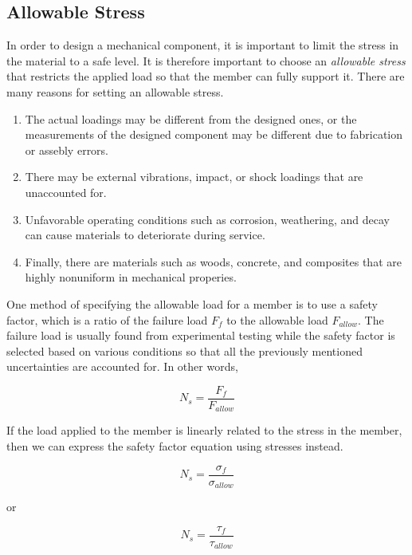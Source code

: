 \documentclass[
fontsize=10pt,
a4paper,
twosides=false,
open=any,
svgnames,
]{kaobook} %
\begin{document}
\subsection{Allowable Stress}

In order to design a mechanical component, it is important to limit the stress in the material to a safe level. It is therefore important to choose an \emph{allowable stress} that restricts the applied load so that the member can fully support it. There are many reasons for setting an allowable stress.

\begin{enumerate}
  \item The actual loadings may be different from the designed ones, or the measurements of the designed component may be different due to fabrication or assebly errors.
  \item There may be external vibrations, impact, or shock loadings that are unaccounted for.
  \item Unfavorable operating conditions such as corrosion, weathering, and decay can cause materials to deteriorate during service.
  \item Finally, there are materials such as woods, concrete, and composites that are highly nonuniform in mechanical properies.
\end{enumerate}

One method of specifying the allowable load for a member is to use a safety factor, which is a ratio of the failure load $F_{f}$ to the allowable load $F_{allow}$. The failure load is usually found from experimental testing while the safety factor is selected based on various conditions so that all the previously mentioned uncertainties are accounted for. In other words,

\begin{equation}
  \label{eq:1}
  N_{s} = \frac{F_{f}}{F_{allow}}
\end{equation}

If the load applied to the member is linearly related to the stress in the member, then we can express the safety factor equation using stresses instead.

\begin{equation}
  \label{eq:2}
  N_{s} = \frac{\sigma_{f}}{\sigma_{allow}}
\end{equation}

or

\begin{equation}
  \label{eq:3}
  N_{s} = \frac{\tau_{f}}{\tau_{allow}}
\end{equation}
\end{document}
